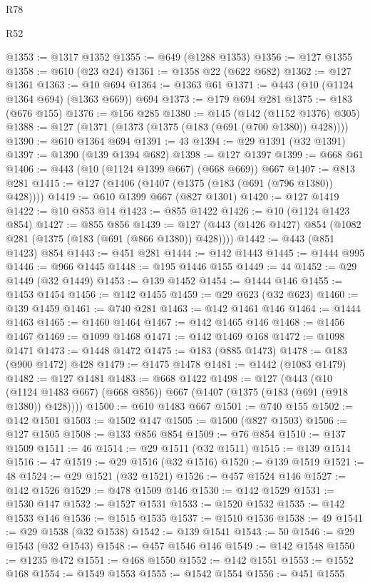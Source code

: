 \begin{lexlean}{R78}
\begin{lexlean}{R52}
\begin{coremodule}
{{{{{{{{{{{{{{{{{{{{{{{{{{{{{{{{{{{{{{{{{{{{{{{{{{{{{{{{{{{{{{{{{{{{{{{{{{{{{{{{{{{{{{{{{{{{{{{{{{{{{{{{{{{{{{{{{{{{{{{{{{{{{{{{{{{{{{{{{{{{{{{{{{{{{{{{{{{{{{{{{{{{{{{{{{{{{{{{{{{{{{{{{{{{{{{{{{{{{{@1353 := @1317 @1352
@1355 := @649 (@1288 @1353)
@1356 := @127 @1355
@1358 := @610 (@23 @24)
@1361 := @1358 @22 (@622 @682)
@1362 := @127 @1361
@1363 := @10 @694
@1364 := @1363 @61
@1371 := @443 (@10 (@1124 @1364 @694) (@1363 @669)) @694
@1373 := @179 @694 @281
@1375 := @183 (@676 @155)
@1376 := @156 @285
@1380 := @145 (@142 (@1152 @1376) @305)
@1388 := @127 (@1371 (@1373 (@1375 (@183 (@691 (@700 @1380)) @428))))
@1390 := @610 @1364 @694
@1391 := 43
@1394 := @29 @1391 (@32 @1391)
@1397 := @1390 (@139 @1394 @682)
@1398 := @127 @1397
@1399 := @668 @61
@1406 := @443 (@10 (@1124 @1399 @667) (@668 @669)) @667
@1407 := @813 @281
@1415 := @127 (@1406 (@1407 (@1375 (@183 (@691 (@796 @1380)) @428))))
@1419 := @610 @1399 @667 (@827 @1301)
@1420 := @127 @1419
@1422 := @10 @853 @14
@1423 := @855 @1422
@1426 := @10 (@1124 @1423 @854)
@1427 := @855 @856
@1439 := @127 (@443 (@1426 @1427) @854 (@1082 @281 (@1375 (@183 (@691 (@866 @1380)) @428))))
@1442 := @443 (@851 @1423) @854
@1443 := @451 @281
@1444 := @142 @1443
@1445 := @1444 @995
@1446 := @966 @1445
@1448 := @195 @1446 @155
@1449 := 44
@1452 := @29 @1449 (@32 @1449)
@1453 := @139 @1452
@1454 := @1444 @146
@1455 := @1453 @1454
@1456 := @142 @1455
@1459 := @29 @623 (@32 @623)
@1460 := @139 @1459
@1461 := @740 @281
@1463 := @142 @1461 @146
@1464 := @1444 @1463
@1465 := @1460 @1464
@1467 := @142 @1465 @146
@1468 := @1456 @1467
@1469 := @1099 @1468
@1471 := @142 @1469 @168
@1472 := @1098 @1471
@1473 := @1448 @1472
@1475 := @183 (@885 @1473)
@1478 := @183 (@900 @1472) @428
@1479 := @1475 @1478
@1481 := @1442 (@1083 @1479)
@1482 := @127 @1481
@1483 := @668 @1422
@1498 := @127
    (@443 (@10 (@1124 @1483 @667) (@668 @856)) @667 (@1407 (@1375 (@183 (@691 (@918 @1380)) @428))))
@1500 := @610 @1483 @667
@1501 := @740 @155
@1502 := @142 @1501
@1503 := @1502 @147
@1505 := @1500 (@827 @1503)
@1506 := @127 @1505
@1508 := @133 @856 @854
@1509 := @76 @854
@1510 := @137 @1509
@1511 := 46
@1514 := @29 @1511 (@32 @1511)
@1515 := @139 @1514
@1516 := 47
@1519 := @29 @1516 (@32 @1516)
@1520 := @139 @1519
@1521 := 48
@1524 := @29 @1521 (@32 @1521)
@1526 := @457 @1524 @146
@1527 := @142 @1526
@1529 := @478 @1509 @146
@1530 := @142 @1529
@1531 := @1530 @147
@1532 := @1527 @1531
@1533 := @1520 @1532
@1535 := @142 @1533 @146
@1536 := @1515 @1535
@1537 := @1510 @1536
@1538 := 49
@1541 := @29 @1538 (@32 @1538)
@1542 := @139 @1541
@1543 := 50
@1546 := @29 @1543 (@32 @1543)
@1548 := @457 @1546 @146
@1549 := @142 @1548
@1550 := @1235 @472
@1551 := @468 @1550
@1552 := @142 @1551
@1553 := @1552 @168
@1554 := @1549 @1553
@1555 := @1542 @1554
@1556 := @451 @1555
}}}}}}}}}}}}}}}}}}}}}}}}}}}}}}}}}}}}}}}}}}}}}}}}}}}}}}}}}}}}}}}}}}}}}}}}}}}}}}}}}}}}}}}}}}}}}}}}}}}}}}}}}}}}}}}}}}}}}}}}}}}}}}}}}}}}}}}}}}}}}}}}}}}}}}}}}}}}}}}}}}}}}}}}}}}}}}}}}}}}}}}}}}}}}}}}}}}}}}
\end{coremodule}
\end{lexlean}
\end{lexlean}
